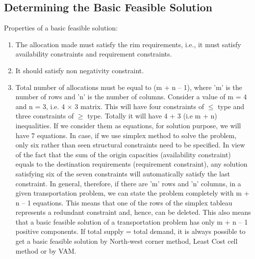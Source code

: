\subsection{Determining the Basic Feasible Solution}
Properties of a basic feasible solution:
\begin{enumerate}
	\item The allocation made must satisfy the rim requirements, i.e., it must satisfy availability constraints and requirement constraints.
	\item It should satisfy non negativity constraint.
	\item Total number of allocations must be equal to (m + n – 1), where 'm' is the number of rows and 'n' is the number of columns. Consider a value of m = 4 and n = 3, i.e. 4 $\times$ 3 matrix. This will have four constraints of $\leq$ type and three constraints of $\geq$ type. Totally it will have 4 + 3 (i.e m + n) inequalities. If we consider them as equations, for solution purpose, we will have 7 equations. In case, if we use simplex method to solve the problem, only six rather than seen structural constraints need to be specified. In view of the fact that the sum of the origin capacities (availability constraint) equals to the destination requirements (requirement constraint), any solution satisfying six of the seven constraints will automatically satisfy the last constraint. In general, therefore, if there are 'm' rows and 'n' columns, in a given transportation problem, we can state the problem completely with m + n – 1 equations. This means that one of the rows of the simplex tableau represents a redundant constraint and, hence, can be deleted. This also means that a basic feasible solution of a transportation problem has only m + n – 1 positive components. If total supply = total demand, it is always possible to get a basic feasible solution by North-west corner method, Least Cost cell method or by VAM.
\end{enumerate}
